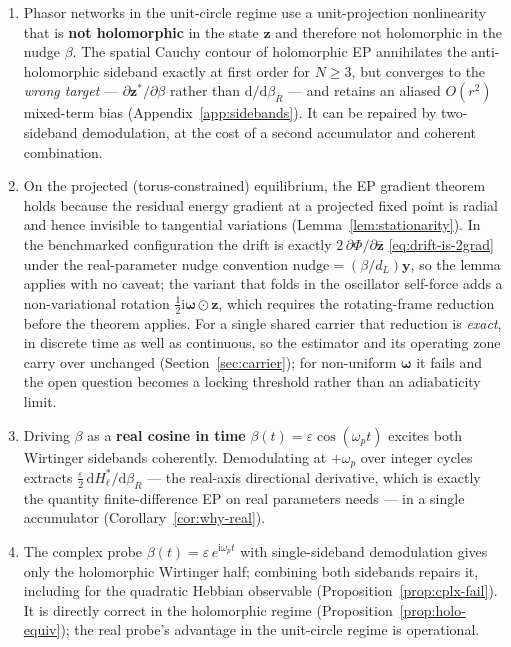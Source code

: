 \documentclass[11pt]{article}
\newcommand{\im}{\mathrm{i}}
\newcommand{\dd}{\mathrm{d}}
\theoremstyle{definition}
\begin{document}
\begin{enumerate}
\item Phasor networks in the unit-circle regime use a unit-projection
  nonlinearity that is \textbf{not holomorphic} in the state $\bm{z}$
  and therefore not holomorphic in the nudge $\beta$.  The spatial
  Cauchy contour of holomorphic EP annihilates the anti-holomorphic
  sideband exactly at first order for $N\ge3$, but converges to the
  \emph{wrong target} --- $\partial\bm{z}^*/\partial\beta$ rather than
  $\dd/\dd\beta_R$ --- and retains an aliased $O(r^2)$ mixed-term bias
  (Appendix~\ref{app:sidebands}).  It can be repaired by two-sideband
  demodulation, at the cost of a second accumulator and coherent
  combination.

\item On the projected (torus-constrained) equilibrium, the EP
  gradient theorem holds because the residual energy gradient at a
  projected fixed point is radial and hence invisible to tangential
  variations (Lemma~\ref{lem:stationarity}).  In the benchmarked
  configuration the drift is exactly $2\,\partial\Phi/\partial\bar{\bm{z}}$
  \eqref{eq:drift-is-2grad} under the real-parameter nudge convention
  $\mathrm{nudge}=(\beta/d_L)\bm{y}$, so the lemma applies with no
  caveat; the variant that folds in the oscillator self-force adds a
  non-variational rotation $\tfrac12\im\bm{\omega}\odot\bm{z}$, which
  requires the rotating-frame reduction before the theorem applies.
  For a single shared carrier that reduction is \emph{exact}, in
  discrete time as well as continuous, so the estimator and its
  operating zone carry over unchanged (Section~\ref{sec:carrier});
  for non-uniform $\bm{\omega}$ it fails and the open question becomes
  a locking threshold rather than an adiabaticity limit.

\item Driving $\beta$ as a \textbf{real cosine in time}
  $\beta(t) = \varepsilon\cos(\omega_p t)$ excites both Wirtinger
  sidebands coherently.  Demodulating at $+\omega_p$ over integer
  cycles extracts $\tfrac{\varepsilon}{2}\,\dd H_\ell^*/\dd\beta_R$ ---
  the real-axis directional derivative, which is exactly the quantity
  finite-difference EP on real parameters needs --- in a single
  accumulator (Corollary~\ref{cor:why-real}).

\item The complex probe $\beta(t) = \varepsilon\,e^{\im\omega_p t}$
  with single-sideband demodulation gives only the holomorphic
  Wirtinger half; combining both sidebands repairs it, including for
  the quadratic Hebbian observable (Proposition~\ref{prop:cplx-fail}).
  It is directly correct in the holomorphic regime
  (Proposition~\ref{prop:holo-equiv}); the real probe's advantage in
  the unit-circle regime is operational.


\end{enumerate}
\end{document}
